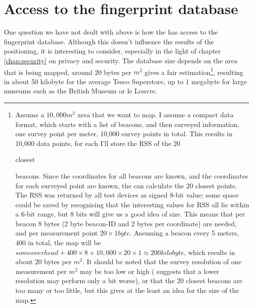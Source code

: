 \section{Access to the fingerprint database}
\label{architecture-database}
One question we have not dealt with above is how the \device has access to the fingerprint database.
Although this doesn't influence the results of the positioning, it is interesting to consider, especially in the light of chapter \ref{chap:security} on privacy and security.
The database size depends on the area that is being mapped, around 20 bytes per $m^2$ gives a fair estimation\footnote{Assume a $10,000m^2$ area that we want to map.
    I assume a compact data format, which starts with a list of beacons, and then surveyed information, one survey point per meter, 10,000 survey points in total.
    This results in 10,000 data points, for each I'll store the RSS of the 20 \begin{em}closest\end{em} beacons.
    Since the coordinates for all beacons are known, and the coordinates for each surveyed point are known, the \device can calculate the 20 closest points.
    The RSS was returned by all test devices as signed 8-bit value; some space could be saved by recognising that the interesting values for RSS all lie within a 6-bit range, but 8 bits will give us a good idea of size.
    This means that per beacon 8 bytes (2 byte beacon-ID and 2 bytes per coordinate) are needed, and per measurement point $20 \times 1 byte$.
    Assuming a beacon every 5 meters, 400 in total, the map will be $some overhead + 400 \times 8 + 10,000 \times 20 \times 1 \approx 200 kilobyte$, which results in about 20 bytes per $m^2$.
    It should be noted that the survey resolution of one measurement per $m^2$ may be too low or high (\citet{bahl2000radar} suggests that a lower resolution may perform only a bit worse), or that the 20 closest beacons are too many or too little, but this gives at the least an idea for the size of the map.
}, resulting in about 50 kilobyte for the average Tesco Superstore, up to 1 megabyte for large museums such as the British Museum or le Louvre.

